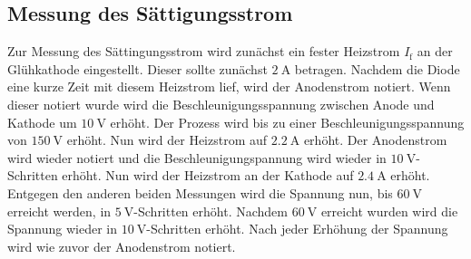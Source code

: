 \subsection{Messung des Sättigungsstrom}
Zur Messung des Sättingungsstrom wird zunächst ein fester Heizstrom $I_\text{f}$ an der Glühkathode eingestellt.
Dieser sollte zunächst $\SI{2}{\A}$ betragen.
Nachdem die Diode eine kurze Zeit mit diesem Heizstrom lief, wird der Anodenstrom notiert.
Wenn dieser notiert wurde wird die Beschleunigungsspannung zwischen Anode und Kathode um $\SI{10}{\V}$ erhöht.
Der Prozess wird bis zu einer Beschleunigungsspannung von $\SI{150}{\V}$ erhöht.
Nun wird der Heizstrom auf $\SI{2.2}{\A}$ erhöht.
Der Anodenstrom wird wieder notiert und die Beschleunigungspannung wird wieder in $\SI{10}{\V}$-Schritten erhöht.
Nun wird der Heizstrom an der Kathode auf $\SI{2.4}{\A}$ erhöht.
Entgegen den anderen beiden Messungen wird die Spannung nun, bis $\SI{60}{\V}$ erreicht werden, in $\SI{5}{\V}$-Schritten erhöht.
Nachdem $\SI{60}{\V}$ erreicht wurden wird die Spannung wieder in $\SI{10}{\V}$-Schritten erhöht.
Nach jeder Erhöhung der Spannung wird wie zuvor der Anodenstrom notiert.

